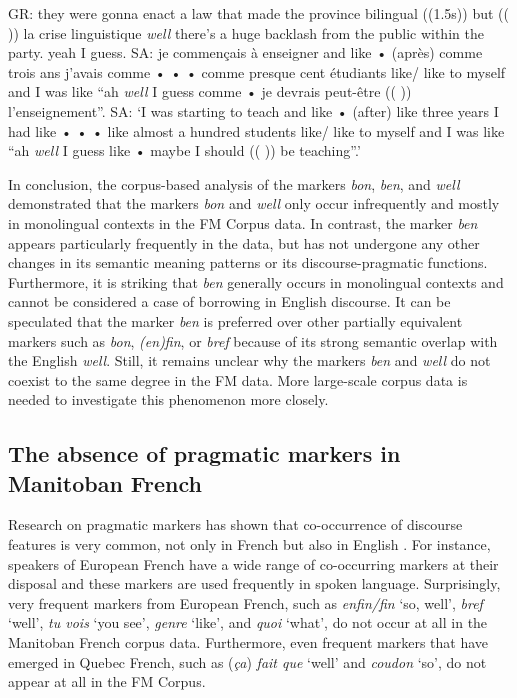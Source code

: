 \documentclass[output=paper]{langscibook}
\begin{document}
\begin{exe}
    \ex\label{hennecke:ex:47} GR: they were gonna enact a law that made the province bilingual ((1.5s)) but (( )) la crise linguistique \textit{well} there’s a huge backlash from the public within the party. yeah I guess.
    \ex\label{hennecke:ex:48} SA: je commençais à enseigner and like • (après) comme trois ans j’avais comme • • • comme presque cent étudiants like/ like to myself and I was like “ah \textit{well} I guess comme • je devrais peut-être (( )) l’enseignement”.
    \glt SA: ‘I was starting to teach and like • (after) like three years I had like • • • like almost a hundred students like/ like to myself and I was like “ah \textit{well} I guess like • maybe I should (( )) be teaching”.’
\end{exe}


In conclusion, the corpus-based analysis of the markers \textit{bon}, \textit{ben}, and \textit{well} demonstrated that the markers \textit{bon} and \textit{well} only occur infrequently and mostly in monolingual contexts in the FM Corpus data. In contrast, the marker \textit{ben} appears particularly frequently in the data, but has not undergone any other changes in its semantic meaning patterns or its discourse-pragmatic functions. Furthermore, it is striking that \textit{ben} generally occurs in monolingual contexts and cannot be considered a case of borrowing in English discourse. It can be speculated that the marker \textit{ben} is preferred over other partially equivalent markers such as \textit{bon}, \textit{(en)fin}, or \textit{bref} because of its strong semantic overlap with the English \textit{well}. Still, it remains unclear why the markers \textit{ben} and \textit{well} do not coexist to the same degree in the FM  data. More large-scale corpus data is needed to investigate this phenomenon more closely.

\subsection{The absence of pragmatic markers in Manitoban French}\label{hennecke:sec:3.4}
Research on pragmatic markers has shown that co-occurrence of discourse features is very common, not only in French but also in English \citep{Pichler.2010}. For instance, speakers of European French have a wide range of co-occur\-ring markers at their disposal and these markers are used frequently in spoken language. Surprisingly, very frequent markers from European French, such as \textit{enfin/fin} ‘so, well’, \textit{bref} ‘well’, \textit{tu vois} ‘you see’, \textit{genre} ‘like’, and \textit{quoi} ‘what’, do not occur at all in the Manitoban French corpus data. Furthermore, even frequent markers that have emerged in Quebec French, such as (\textit{ça}) \textit{fait que} ‘well’ and \textit{coudon} ‘so’, do not appear at all in the FM Corpus.
\end{document}
